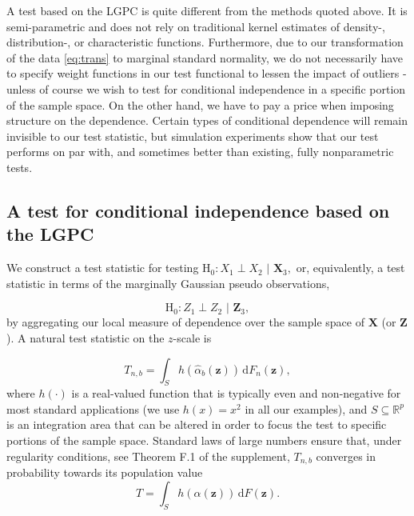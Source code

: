 \documentclass[
  12pt,
  letterpaper]{article}
\newcommand{\X}{\bm{X}}
\newcommand{\Z}{\bm{Z}}
\newcommand{\z}{\bm{z}}
\newcommand{\di}{\,\textrm{d}}
\theoremstyle{definition}
\theoremstyle{definition}
\theoremstyle{definition}
\theoremstyle{remark}
\begin{document}
A test based on the LGPC is quite different from the methods quoted above. It is semi-parametric and does not rely on traditional kernel estimates of density-, \mbox{distribution-,} or characteristic functions. Furthermore, due to our transformation of the data \eqref{eq:trans} to marginal standard normality, we do not necessarily have to specify weight functions in our test functional to lessen the impact of outliers - unless of course we wish to test for conditional independence in a specific portion of the sample space. On the other hand, we have to pay a price when imposing structure on the dependence. Certain types of conditional dependence will remain invisible to our test statistic, but simulation experiments show that our test performs on par with, and sometimes better than existing, fully nonparametric tests.

\hypertarget{thetest}{%
\subsection{A test for conditional independence based on the LGPC}\label{thetest}}

We construct a test statistic for testing \(\textrm{H}_0: X_1 \perp X_2 \,\, | \,\, \X_3,\) or, equivalently, a test statistic in terms of the marginally Gaussian pseudo observations,

\begin{equation}
\textrm{H}_0: Z_1 \perp Z_2 \,\, | \,\, \Z_3,
\label{eq:ci-test}
\end{equation}
by aggregating our local measure of dependence over the sample space of \(\X\) (or \(\Z\)). A natural test statistic on the \(z\)-scale is

\begin{equation}
T_{n,b} = \int_S h\left( \widehat \alpha_b(\z)  \right) \di F_n(\z),
\label{eq:teststatistic}
\end{equation}
where \(h(\cdot)\) is a real-valued function that is typically even and non-negative for most standard applications (we use \(h(x) = x^2\) in all our examples), and \(S \subseteq \mathbb{R}^p\) is an integration area that can be altered in order to focus the test to specific portions of the sample space. Standard laws of large numbers ensure that, under regularity conditions, see Theorem F.1 of the supplement, \(T_{n,b}\) converges in probability towards its population value \[T = \int_S h\left(\alpha(\z)\right) \di F(\z).\]
\end{document}
